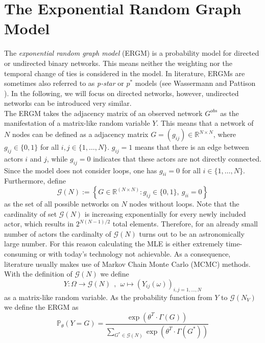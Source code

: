 \documentclass[headsepline=true, abstracton]{scrartcl}
\begin{document}
 \section*{The Exponential Random Graph Model}
The \textit{exponential random graph model} (ERGM) is a probability model for directed or undirected binary networks. This means neither the weighting nor the temporal change of ties is considered in the model.
In literature, ERGMs are sometimes also referred to as \textit{p-star} or $p^*$ models (see Wassermann and Pattison \cite{Wasserman.1996}). In the following, we will focus on directed networks, however, undirected networks can be introduced very similar.\\[0.3cm] %
The ERGM takes the adjacency matrix of an observed network $G^{obs}$ as the manifestation of a matrix-like random variable $Y$. This means that a network of $N$ nodes can be defined as a adjacency matrix $G=(g_{ij})\in \mathbb{R}^{N \times N}$, where $g_{ij} \in \{0,1\}$ for all $i,j \in \{1,\dots , N\}$. $g_{ij}=1$ means that there is an edge between actors $i$ and $j$, while $g_{ij}=0$ indicates that these actors are not directly connected. Since the model does not consider loops, one has $g_{ii}=0$ for all $i \in \{1,\dots , N\}$. Furthermore, define
$$ \mathcal{G}(N) := \left\{ G \in \mathbb{R}^{(N \times N)}: g_{ij} \in \{0,1\},~g_{ii}=0\right\}$$
as the set of all possible networks on $N$ nodes without loops. Note that the cardinality of set $\mathcal{G}(N)$ is increasing exponentially for every newly included actor, which results in $2^{N(N-1)/2}$ total elements. Therefore, for an already small number of actors the cardinalty of $\mathcal{G}(N)$ turns out to be an astronomically large number. For this reason calculating the MLE is either extremely time-consuming or with today's technology not achievable. As a consequence, literature usually makes use of Markov Chain Monte Carlo (MCMC) methods.\\  
With the definition of $\mathcal{G}(N)$ we define 
$$Y: \Omega \to \mathcal{G}(N)~~,~~\omega \mapsto (Y_{ij}(\omega))_{i,j=1,\dots,N}$$
as a matrix-like random variable. As the probability function from $Y$ to $\mathcal{G}(N_V)$ we define the ERGM as
\begin{equation}
\mathbb{P}_{\theta}(Y=G)=\dfrac{\exp(\theta^T \cdot \Gamma(G))}{\sum_{G^* \in \mathcal{G}(N)} \exp(\theta^T \cdot \Gamma(G^*))} 
\label{ERGM}
\end{equation}
\end{document}
